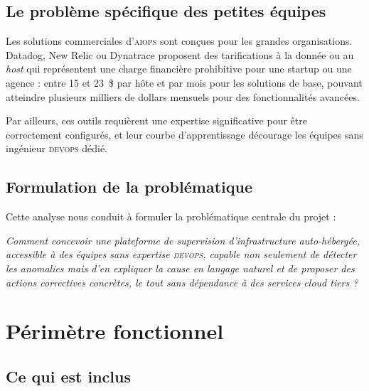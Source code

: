 \subsection{Le problème spécifique des petites équipes}

Les solutions commerciales d'\textsc{aiops} sont conçues pour les grandes
organisations. Datadog, New Relic ou Dynatrace proposent des tarifications à la
donnée ou au \textit{host} qui représentent une charge financière prohibitive pour
une startup ou une agence : entre 15 et 23~\$ par hôte et par mois pour les
solutions de base, pouvant atteindre plusieurs milliers de dollars mensuels pour
des fonctionnalités avancées.

Par ailleurs, ces outils requièrent une expertise significative pour être
correctement configurés, et leur courbe d'apprentissage décourage les équipes
sans ingénieur \textsc{devops} dédié.

\subsection{Formulation de la problématique}

Cette analyse nous conduit à formuler la problématique centrale du projet :

\begin{infobox}[Problématique]
\textit{Comment concevoir une plateforme de supervision d'infrastructure auto-hébergée,
accessible à des équipes sans expertise \textsc{devops}, capable non seulement de
détecter les anomalies mais d'en expliquer la cause en langage naturel et de
proposer des actions correctives concrètes, le tout sans dépendance à des services
cloud tiers ?}
\end{infobox}

\section{Périmètre fonctionnel}

\subsection{Ce qui est inclus}

